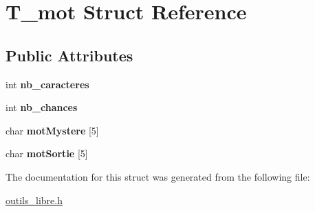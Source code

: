 \hypertarget{structT__mot}{\section{T\-\_\-mot Struct Reference}
\label{structT__mot}
}
\subsection*{Public Attributes}
\begin{DoxyCompactItemize}
\item 
\hypertarget{structT__mot_a4549670a531e21e5167ac7407f69f662}{int {\bfseries nb\-\_\-caracteres}}\label{structT__mot_a4549670a531e21e5167ac7407f69f662}

\item 
\hypertarget{structT__mot_a96bcf38759b9974b0becf5a15600f074}{int {\bfseries nb\-\_\-chances}}\label{structT__mot_a96bcf38759b9974b0becf5a15600f074}

\item 
\hypertarget{structT__mot_aff4e2b2006a6aef7c53779b25f48fdfa}{char {\bfseries mot\-Mystere} \mbox{[}5\mbox{]}}\label{structT__mot_aff4e2b2006a6aef7c53779b25f48fdfa}

\item 
\hypertarget{structT__mot_ae645e27fe19af06859bb0457000be528}{char {\bfseries mot\-Sortie} \mbox{[}5\mbox{]}}\label{structT__mot_ae645e27fe19af06859bb0457000be528}

\end{DoxyCompactItemize}


The documentation for this struct was generated from the following file\-:\begin{DoxyCompactItemize}
\item 
\hyperlink{outils__libre_8h}{outils\-\_\-libre.\-h}\end{DoxyCompactItemize}
